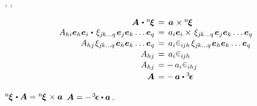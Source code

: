 \noindent
{},
,

\nopagebreak\vspace{-0.1em}
\begin{equation*}
\begin{array}{r@{\hspace{1ex}}c@{\hspace{1ex}}l}
\bm{A} \hspace{.2ex}\dotp\hspace{.1ex} {^\mathrm{n}\hspace{-0.12ex}\bm{\xi}} & = & \bm{a} \hspace{.1ex} \times {^\mathrm{n}\hspace{-0.12ex}\bm{\xi}}
\\
%
A_{hi} \bm{e}_h \bm{e}_i \hspace{.1ex}\dotp\hspace{.25ex} \xi_{j\hspace{-0.1ex}k \ldots q} \hspace{.2ex} \bm{e}_j \bm{e}_k \ldots \bm{e}_q & = & a_{i} \bm{e}_i \times\hspace{.2ex} \xi_{j\hspace{-0.1ex}k \ldots q} \hspace{.2ex} \bm{e}_j \bm{e}_k \ldots \bm{e}_q
\\[.1em]
%
A_{hj} \hspace{.2ex} \xi_{j\hspace{-0.1ex}k \ldots q} \hspace{.2ex} \bm{e}_h \bm{e}_k \ldots \bm{e}_q & = & a_{i} \permutationsparitysymbols{i\hspace{-0.1ex}jh} \hspace{.2ex} \xi_{j\hspace{-0.1ex}k \ldots q} \hspace{.2ex} \bm{e}_h \bm{e}_k \ldots \bm{e}_q
\\[.1em]
%
A_{hj} & = & a_{i} \permutationsparitysymbols{i\hspace{-0.1ex}jh}
\\[.1em]
%
A_{hj} & = & \! - \, a_{i} \permutationsparitysymbols{ihj}
\\[.2em]
%
\bm{A} & = & \! - \, \bm{a} \dotp \permutationsparitytensor
\end{array}
\end{equation*}

\vspace{-0.5em}\noindent
{}%
${{^\mathrm{n}\hspace{-0.12ex}\bm{\xi}} \hspace{.2ex} \dotp \bm{A} = {^\mathrm{n}\hspace{-0.12ex}\bm{\xi}} \hspace{.2ex}\times \bm{a}}$
${\bm{A} = - \hspace{.2ex} \permutationsparitytensor \dotp \bm{a}\hspace{.1ex}}$.

